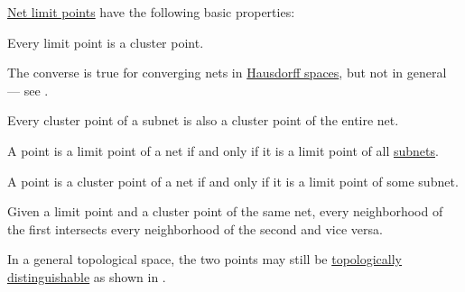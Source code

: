 \begin{proposition}\label{thm:def:net_limit_point}
  \hyperref[def:net_limit_point]{Net limit points} have the following basic properties:

  \begin{thmenum}
     Every limit point is a cluster point.

    The converse is true for converging nets in \hyperref[def:separation_axioms/T2]{Hausdorff spaces}, but not in general --- see .

     Every cluster point of a subnet is also a cluster point of the entire net.

     A point is a limit point of a net if and only if it is a limit point of all \hyperref[def:subnet]{subnets}.

     A point is a cluster point of a net if and only if it is a limit point of some subnet.

     Given a limit point and a cluster point of the same net, every neighborhood of the first intersects every neighborhood of the second and vice versa.

    In a general topological space, the two points may still be \hyperref[def:topologically_indistinguishable]{topologically distinguishable} as shown in .
  \end{thmenum}
\end{proposition}
